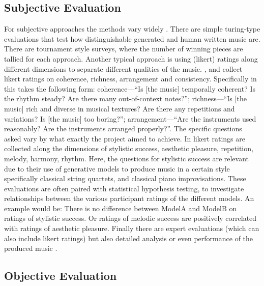 \subsection{Subjective Evaluation}
For subjective approaches the methods vary widely \cite{Xiong_Wang_ai_eval_methods_2023}. There are simple turing-type evaluations that test how distinguishable generated and human written music are. There are tournament style surveys, where the number of winning pieces are tallied for each approach.\cite{Huang_Vaswani_Uszkoreit_Shazeer_Simon_Hawthorne_Dai_Hoffman_Dinculescu_Eck_2018}\cite{Rütte_figaro_2023}
Another typical approach is using (likert) ratings along different dimensions to separate different qualities of the music. \cite{Dong_Chen_MMT_Kirkpatrick_2023}, \cite{Yu_Lu_Wang_Hu_Tan_Ye_Zhang_museformer_2022} and \cite{Chen_Smith_Spijkervet_Wang_Zou_Li_Kong_Du_2024} collect likert ratings on coherence, richness, arrangement and consistency. Specifically in \cite{Dong_Chen_MMT_Kirkpatrick_2023} this takes the following form: 
coherence—“Is [the music] temporally coherent? Is the rhythm steady? Are there many out-of-context notes?”;
richness—“Is [the music] rich and diverse in musical textures? Are there any repetitions and variations? Is [the music] too boring?”; 
arrangement—“Are the instruments used reasonably? Are the instruments arranged properly?”. 
The specific questions asked vary by what exactly the project aimed to achieve. 
In \cite{Yin_Reuben_Stepney_Collins_2023} likert ratings are collected along the dimensions of stylistic success, aesthetic pleasure, repetition, melody, harmony, rhythm. Here, the questions for stylistic success are relevant due to their use of generative models to produce music in a certain style specifically classical string quartets, and classical piano improvisations. 
These evaluations are often paired with statistical hypothesis testing, to investigate relationships between the various participant ratings of the different models. An example would be: There is no difference between ModelA and ModelB on ratings of stylistic success. Or ratings of melodic success are positively correlated with ratings of aesthetic pleasure.
Finally there are expert evaluations (which can also include likert ratings) but also detailed analysis or even performance of the produced music \cite{Sturm_Ben-Tal_2016} \cite{Yin_Reuben_Stepney_Collins_2023}. \\

\subsection{Objective Evaluation}

